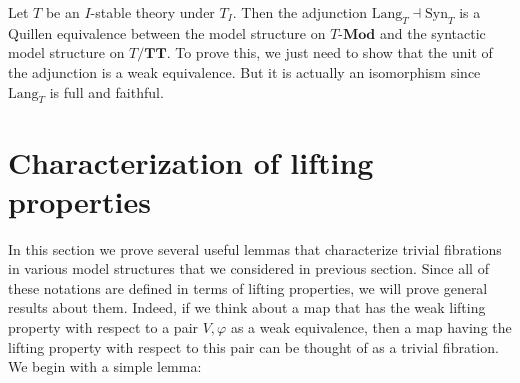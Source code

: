 \documentclass[reqno]{amsart}
\theoremstyle{definition}
\theoremstyle{remark}
\newcommand{\cat}[1]{\mathbf{#1}}
\newcommand{\Mod}[1]{#1\text{-}\cat{Mod}}
\newcommand{\algtt}{\cat{TT}}
\newcommand{\Syn}{\mathrm{Syn}}
\newcommand{\Lang}{\mathrm{Lang}}
\numberwithin{figure}{section}
\begin{document}
Let $T$ be an $I$-stable theory under $T_I$.
Then the adjunction $\Lang_T \dashv \Syn_T$ is a Quillen equivalence between the model structure on $\Mod{T}$ and the syntactic model structure on $T/\algtt$.
To prove this, we just need to show that the unit of the adjunction is a weak equivalence.
But it is actually an isomorphism since $\Lang_T$ is full and faithful.

\section{Characterization of lifting properties}
\label{sec:triv-fib}

In this section we prove several useful lemmas that characterize trivial fibrations in various model structures that we considered in previous section.
Since all of these notations are defined in terms of lifting properties, we will prove general results about them.
Indeed, if we think about a map that has the weak lifting property with respect to a pair $V,\varphi$ as a weak equivalence,
then a map having the lifting property with respect to this pair can be thought of as a trivial fibration.
We begin with a simple lemma:
\end{document}
